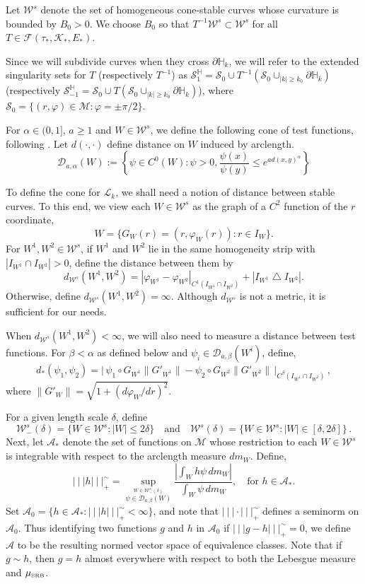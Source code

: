 \documentclass{amsart}
\numberwithin{equation}{section}
\newcommand\cA{{\mathcal A}}
\newcommand\cD{{\mathcal D}}
\newcommand\cF{{\mathcal F}}
\newcommand\cK{{\mathcal K}}
\newcommand\cL{{\mathcal L}}
\newcommand\cM{{\mathcal M}}
\newcommand\cS{{\mathcal S}}
\newcommand\cW{{\mathcal W}}
\newcommand\bH{{\mathbb H}}
\newcommand\vf{\varphi}
\newcommand{\tri}{{|\:\!\!|\:\!\!|}}
\newcommand{\musrb}{\mu_{\mbox{\tiny SRB}}}
\begin{document}
Let $\cW^s$ denote the set of homogeneous cone-stable curves whose curvature is bounded by $B_0>0$.  We choose
$B_0$ so that $T^{-1}\cW^s \subset \cW^s$ for all $T \in \cF(\tau_*, \cK_*, E_*)$.

Since we will subdivide curves when they cross $\partial \bH_k$, we will refer to the extended 
singularity sets for $T$ (respectively $T^{-1}$) as $\cS_1^{\bH} = \cS_0 \cup T^{-1}( \cS_0 \cup_{|k| \ge k_0} \partial \bH_k)$ (respectively $\cS_{-1}^{\bH} = \cS_0 \cup T( \cS_0 \cup_{|k| \ge k_0} \partial \bH_k)$),
where $\cS_0 = \{ (r, \vf) \in \cM : \vf = \pm \pi/2 \}$.

For $\alpha \in (0,1]$, $a \ge 1$ and $W \in \cW^s$, we define the following cone of test functions,
following \cite[Section~4.1]{DL22}.  Let $d(\cdot , \cdot)$ define distance on $W$ induced by arclength.
\[
\cD_{a, \alpha}(W) := \left\{ \psi \in C^0(W) : \psi > 0, \frac{\psi(x)}{\psi(y)} \le e^{a d(x,y)^\alpha} \right\}
\]

To define the cone for $\cL_k$, we shall need a notion of distance between stable curves.  To this end, we view
each $W \in \cW^s$ as the graph of a $C^2$ function of the $r$ coordinate,
\begin{equation}
\label{eq:graph}
W = \{ G_W(r) = (r, \vf_W(r)) : r \in I_W \} .
\end{equation}
For $W^1, W^2 \in \cW^s$, if $W^1$ and $W^2$ lie in the same homogeneity strip with $|I_{W^1} \cap I_{W^2}| >0$, define the distance between them by
\[
d_{\cW^s}(W^1, W^2) = |\vf_{W^1} - \vf_{W^2}|_{C^1(I_{W^1} \cap I_{W^2})} + |I_{W^1} \bigtriangleup I_{W^2}| .
\]
Otherwise, define $d_{\cW^s}(W^1, W^2) = \infty$.  Although $d_{\cW^s}$ is not a metric, it is sufficient for our needs.

When $d_{\cW^s}(W^1, W^2) < \infty$, we will also need to measure a distance between test functions.  For
$\beta < \alpha$ as defined below and $\psi_i \in \cD_{a, \beta}(W^i)$, define,
\[
d_*(\psi_1, \psi_2) = \Big|\,\psi_1 \circ G_{W^1} \| G'_{W^1} \| - \psi_2 \circ G_{W^2} \| G'_{W^2} \|\,  \Big |_{C^\beta(I_{W^1} \cap I_{W^2})} \, ,
\]
where $\| G'_W \| = \sqrt{1 + (d\vf_W/dr)^2}$.

For a given length scale $\delta$, define 
\[
\cW^s_-(\delta) = \{ W \in \cW^s : |W| \le 2\delta \} \quad \mbox{and} \quad
\cW^s(\delta) = \{ W \in \cW^s : |W| \in [\delta, 2\delta] \} \, .
\]
Next, let $\cA_*$ denote the set of functions on $\cM$ whose restriction to each $W \in \cW^s$
is integrable with respect to the arclength measure $dm_W$.  Define,
\[
\tri h \tri_+^\sim = \sup_{\stackrel{W \in \cW^s_-(\delta)}{\psi \in \cD_{a, \beta}(W)}} \frac{| \int_W h \psi \, dm_W |}{\int_W \psi \, dm_W} , \quad \mbox{for } h \in \cA_* .
\]
Set $\cA_0 = \{ h \in \cA_* : \tri h \tri_+^\sim < \infty \}$, and note that $\tri \cdot \tri_+^\sim$
defines a seminorm on $\cA_0$.  Thus identifying two functions $g$ and $h$ in $\cA_0$ if
$\tri g - h \tri_+^\sim=0$, we define $\cA$ to be the resulting normed vector space of equivalence classes.
Note that if $g \sim h$, then $g=h$ almost everywhere with respect to both the Lebesgue measure and
$\musrb$. 
\end{document}
